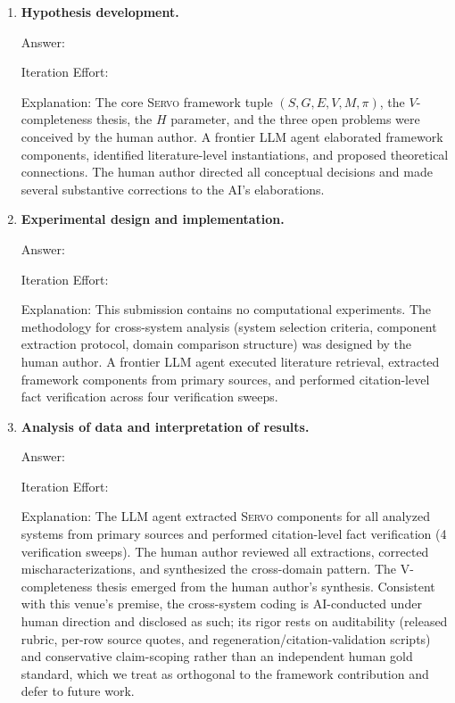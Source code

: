 \documentclass{article}
\newcommand{\sgmvpi}{$(S, G, E, V, M, \pi)$}
\newcommand{\framework}{\textsc{Servo}}
\begin{document}
\begin{enumerate}

  \item \textbf{Hypothesis development.}

    Answer: \involvementB{}

    Iteration Effort: \iterationMedium{}

    Explanation: The core \framework{} framework tuple \sgmvpi{}, the $V$-completeness thesis, the $H$ parameter, and the three open problems were conceived by the human author. A frontier LLM agent elaborated framework components, identified literature-level instantiations, and proposed theoretical connections. The human author directed all conceptual decisions and made several substantive corrections to the AI's elaborations.

  \item \textbf{Experimental design and implementation.}

    Answer: \involvementB{}

    Iteration Effort: \iterationMedium{}

    Explanation: This submission contains no computational experiments. The methodology for cross-system analysis (system selection criteria, component extraction protocol, domain comparison structure) was designed by the human author. A frontier LLM agent executed literature retrieval, extracted framework components from primary sources, and performed citation-level fact verification across four verification sweeps.

  \item \textbf{Analysis of data and interpretation of results.}

    Answer: \involvementC{}

    Iteration Effort: \iterationMedium{}

    Explanation: The LLM agent extracted \framework{} components for all analyzed systems from primary sources and performed citation-level fact verification (4 verification sweeps). The human author reviewed all extractions, corrected mischaracterizations, and synthesized the cross-domain pattern. The V-completeness thesis emerged from the human author's synthesis. Consistent with this venue's premise, the cross-system coding is AI-conducted under human direction and disclosed as such; its rigor rests on auditability (released rubric, per-row source quotes, and regeneration/citation-validation scripts) and conservative claim-scoping rather than an independent human gold standard, which we treat as orthogonal to the framework contribution and defer to future work.


\end{enumerate}
\end{document}
